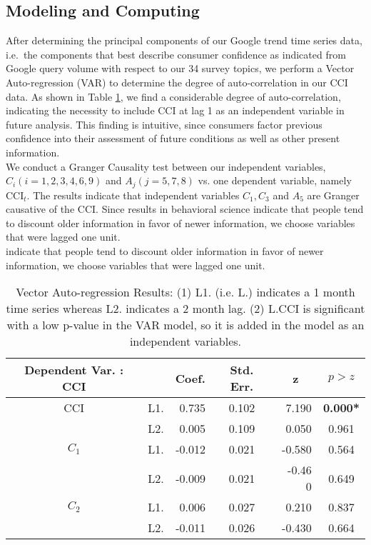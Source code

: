 \documentclass[10pt]{article}
\begin{document}
\subsection*{Modeling  and Computing}

After determining the principal components of our Google trend time series data, i.e.~the components that best describe consumer confidence as indicated from Google query volume with respect to our 34 survey topics, we perform a  Vector Auto-regression (VAR) \cite{Sims1980} to determine the degree of auto-correlation in our CCI data. As shown in Table \ref{VARdata}, we find a considerable degree of auto-correlation, indicating the necessity to include CCI at lag 1 as an independent variable in future analysis. This finding is intuitive, since consumers factor previous confidence into their assessment of future conditions as well as other present information.\\

We conduct a  Granger Causality test \cite{Granger1969} between our independent variables, $C_i (i=1, 2, 3, 4, 6, 9)$ and $A_j (j=5, 7, 8)$ vs. one dependent variable, namely $\mbox{CCI}_t$.
The results indicate that independent variables $C_1, C_3$ and $A_5$ are Granger causative of the $\mbox{CCI}$. Since results in behavioral science \cite{Barberis1998} indicate that people tend to discount older information in favor of newer information, we choose variables that were lagged one unit.\\

\cite{Barberis1998} indicate that people tend to discount older information in favor of newer information, we choose variables that were lagged one unit.\\
\begin{table}
\begin{center}
\begin{tabular}{clrcrc}
\hline
    Dependent Var. : CCI   &  			         &	Coef.	&	Std. Err.	&	z\   \	    &	$p>z$	\\
\hline
                             CCI      &	            L1.	&	0.735	&	0.102	&	7.190	 &	\textbf{0.000*}	\\
	                                   &	            L2.	&	0.005	&	0.109       &	0.050	 &	0.961	\\
                          $C_1$       &	            L1.	&	-0.012	&	0.021	&	-0.580	&	0.564	\\
	                                  &                  L2.       &	-0.009	&	0.021	&	-0.46	0      &	0.649	\\
                         $C_2$       &	            L1.	&	0.006	&	0.027	&	0.210	&	0.837	\\
	                                  &	            L2.	&	-0.011	&	0.026	&	-0.430	&	0.664	\\
\hline
\end{tabular}
\caption{\label{VARdata}Vector Auto-regression Results: (1) L1. (i.e. L.) indicates a 1 month time series whereas L2. indicates a 2 month lag. (2) $\mbox{L.CCI}$ is significant with a low p-value in the VAR model, so it is added in the model as an independent variables. }
\end{center}
\end{table}
\end{document}
